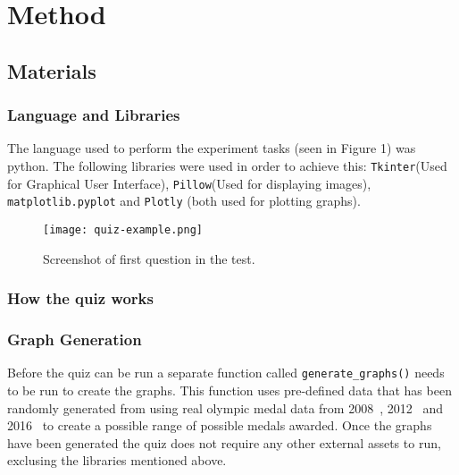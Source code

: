 \section{Method}


\subsection{Materials}
\subsubsection{Language and Libraries}
The language used to perform the experiment tasks (seen in Figure 1) was python. The following libraries were used in order to achieve this:
\verb|Tkinter|(Used for Graphical User Interface), \verb|Pillow|(Used for displaying images), \verb|matplotlib.pyplot| and \verb|Plotly| (both used for plotting graphs).

\begin{figure}[H]
    \centering
    \texttt{[image: quiz-example.png]}
    \caption{Screenshot of first question in the test.}
\end{figure}

\subsubsection{How the quiz works}
\subsubsection*{Graph Generation}
\begin{flushleft}
    Before the quiz can be run a separate function called \verb|generate_graphs()| needs to be run to create the graphs.
    This function uses pre-defined data that has been randomly generated from using real olympic medal data from
    2008~\cite{olympics2008}, 2012~\cite{olympics2012} and 2016~\cite{olympics2016} to create a possible range of possible medals awarded.
    Once the graphs have been generated the quiz does not require any other external assets to run, exclusing the libraries mentioned above.
\end{flushleft}
    
